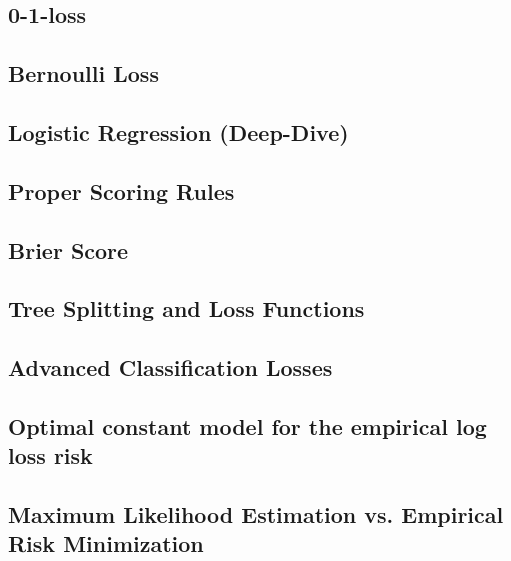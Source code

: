 \subsection{0-1-loss}


\subsection{Bernoulli Loss}


\subsection{Logistic Regression (Deep-Dive)}


\subsection{Proper Scoring Rules}


\subsection{Brier Score}


\subsection{Tree Splitting and Loss Functions}


\subsection{Advanced Classification Losses}


\subsection{Optimal constant model for the empirical log loss risk}


\subsection{Maximum Likelihood Estimation vs. Empirical Risk Minimization}


